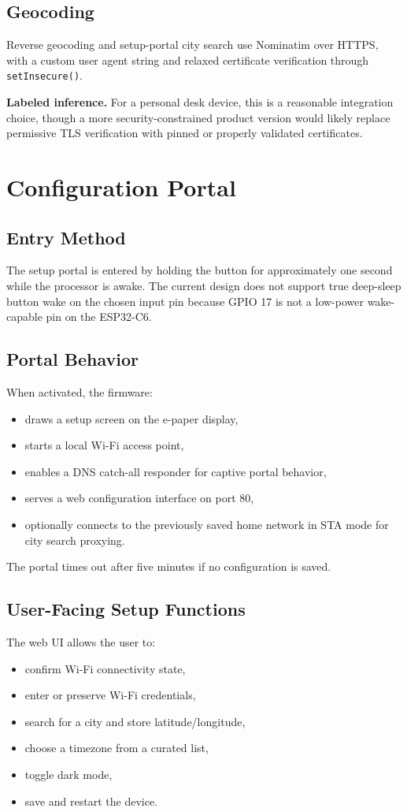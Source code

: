 \documentclass[11pt]{article}
\begin{document}
\subsection{Geocoding}
Reverse geocoding and setup-portal city search use Nominatim over HTTPS, with a custom user agent string and relaxed certificate verification through \texttt{setInsecure()}.

\textbf{Labeled inference.} For a personal desk device, this is a reasonable integration choice, though a more security-constrained product version would likely replace permissive TLS verification with pinned or properly validated certificates.

\section{Configuration Portal}
\subsection{Entry Method}
The setup portal is entered by holding the button for approximately one second while the processor is awake. The current design does not support true deep-sleep button wake on the chosen input pin because GPIO 17 is not a low-power wake-capable pin on the ESP32-C6.

\subsection{Portal Behavior}
When activated, the firmware:
\begin{itemize}
  \item draws a setup screen on the e-paper display,
  \item starts a local Wi-Fi access point,
  \item enables a DNS catch-all responder for captive portal behavior,
  \item serves a web configuration interface on port 80,
  \item optionally connects to the previously saved home network in STA mode for city search proxying.
\end{itemize}

The portal times out after five minutes if no configuration is saved.

\subsection{User-Facing Setup Functions}
The web UI allows the user to:
\begin{itemize}
  \item confirm Wi-Fi connectivity state,
  \item enter or preserve Wi-Fi credentials,
  \item search for a city and store latitude/longitude,
  \item choose a timezone from a curated list,
  \item toggle dark mode,
  \item save and restart the device.
\end{itemize}
\end{document}
